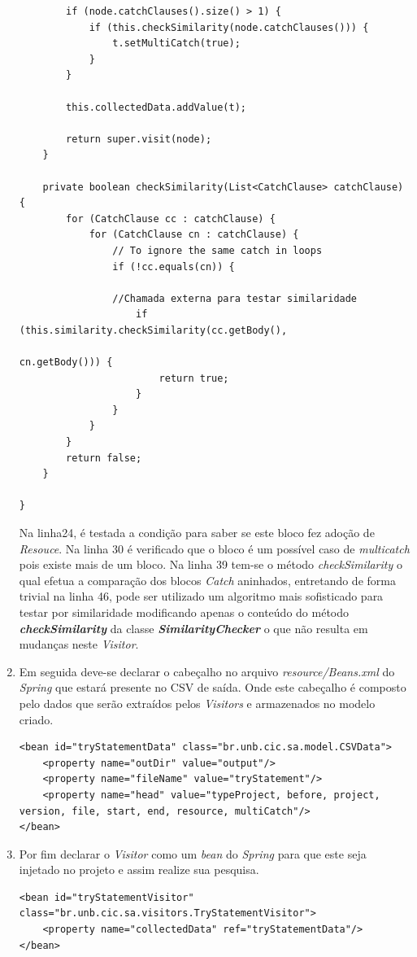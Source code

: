 \begin{enumerate}
\begin{lstlisting}
		if (node.catchClauses().size() > 1) {
			if (this.checkSimilarity(node.catchClauses())) {
				t.setMultiCatch(true);
			}
		}

		this.collectedData.addValue(t);

		return super.visit(node);
	}
	
	private boolean checkSimilarity(List<CatchClause> catchClause) {
		for (CatchClause cc : catchClause) {
			for (CatchClause cn : catchClause) {
				// To ignore the same catch in loops
				if (!cc.equals(cn)) {
				
				//Chamada externa para testar similaridade
					if (this.similarity.checkSimilarity(cc.getBody(),
														cn.getBody())) {
						return true;
					}
				}
			}
		}
		return false;
	}

}
			\end{lstlisting}
			
		 Na linha24, é testada a condição para saber se este bloco fez adoção de \textit{Resouce}. Na linha 30 é verificado que o bloco é um possível caso de \textit{multicatch} pois existe mais de um bloco. Na linha 39 tem-se o método \textit{checkSimilarity} o qual efetua a comparação dos blocos \textit{Catch} aninhados, entretando de forma trivial na linha 46, pode ser utilizado um algoritmo mais sofisticado para testar por similaridade modificando apenas o conteúdo do método \textbf{\textit{checkSimilarity}} da classe \textit{\textbf{SimilarityChecker}} o que não resulta em mudanças neste \textit{Visitor}.
		
	
			\item Em seguida deve-se declarar o cabeçalho no arquivo \textit{resource/Beans.xml} do \textit{Spring} que estará presente no \acs{CSV} de saída. Onde este cabeçalho é composto pelo dados que serão extraídos pelos \textit{Visitors} e armazenados no modelo criado.
			
			\begin{lstlisting}
<bean id="tryStatementData" class="br.unb.cic.sa.model.CSVData">
	<property name="outDir" value="output"/>
	<property name="fileName" value="tryStatement"/>
	<property name="head" value="typeProject, before, project, version, file, start, end, resource, multiCatch"/> 
</bean>
			\end{lstlisting}
			
			
			\item Por fim declarar o \textit{Visitor} como um \textit{bean} do \textit{Spring} para que este seja injetado no projeto e assim realize sua pesquisa.
			
			\begin{lstlisting}
<bean id="tryStatementVisitor" class="br.unb.cic.sa.visitors.TryStatementVisitor">
	<property name="collectedData" ref="tryStatementData"/>
</bean>
			\end{lstlisting}
			
	\end{enumerate}



